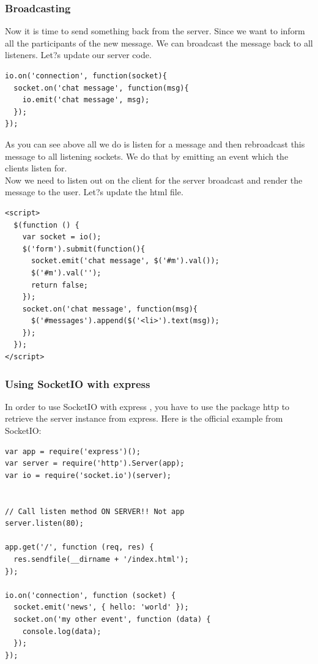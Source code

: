 \documentclass[a4paper]{article}
\begin{document}
\subsubsection{Broadcasting}
Now it is time to send something back from the server. Since we want to inform all the participants of the new message. We can broadcast the message back to all listeners. Let?s update our server code.
\begin{lstlisting}
io.on('connection', function(socket){
  socket.on('chat message', function(msg){
    io.emit('chat message', msg);
  });
});
\end{lstlisting}
As you can see above all we do is listen for a message and then rebroadcast this message to all listening sockets. We do that by emitting an event which the clients listen for.\\

Now we need to listen out on the client for the server broadcast and render the message to the user. Let?s update the html file.
\begin{lstlisting}
<script>
  $(function () {
    var socket = io();
    $('form').submit(function(){
      socket.emit('chat message', $('#m').val());
      $('#m').val('');
      return false;
    });
    socket.on('chat message', function(msg){
      $('#messages').append($('<li>').text(msg));
    });
  });
</script>
\end{lstlisting}
\subsubsection{Using SocketIO with express}
In order to use SocketIO with express , you have to use the package http to retrieve the server instance from express. Here is the official example from SocketIO:
\begin{lstlisting}
var app = require('express')();
var server = require('http').Server(app);
var io = require('socket.io')(server);


// Call listen method ON SERVER!! Not app
server.listen(80);

app.get('/', function (req, res) {
  res.sendfile(__dirname + '/index.html');
});

io.on('connection', function (socket) {
  socket.emit('news', { hello: 'world' });
  socket.on('my other event', function (data) {
    console.log(data);
  });
});
\end{lstlisting}
\end{document}
